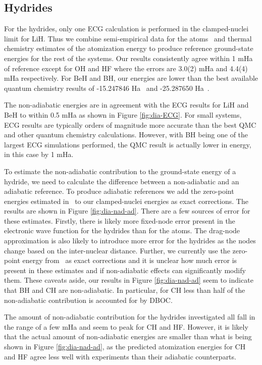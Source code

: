 \documentclass[pra,superscriptaddress,groupedaddress,twocolumn]{revtex4}
\begin{document}
\subsection{Hydrides}



For the hydrides, only one ECG calculation is performed in the clamped-nuclei limit for LiH. Thus we combine semi-empirical data for the atoms~\cite{Davidson_Atoms} and thermal chemistry estimates of the atomization energy to produce reference ground-state energies for the rest of the systems. Our results consistently agree within 1 mHa of reference except for OH and HF where the errors are 3.0(2) mHa and 4.4(4) mHa respectively. For BeH and BH, our energies are lower than the best available quantum chemistry results of -15.247846 Ha~\cite{Koput_BeH} and -25.287650 Ha~\cite{Miliordos_BH}.

The non-adiabatic energies are in agreement with the ECG results for LiH and BeH to within 0.5 mHa as shown in Figure \ref{fig:dia-ECG}. For small systems, ECG results are typically orders of magnitude more accurate than the best QMC and other quantum chemistry calculations. However, with BH being one of the largest ECG simulations performed, the QMC result is actually lower in energy, in this case by 1 mHa.

To estimate the non-adiabatic contribution to the ground-state energy of a hydride, we need to calculate the difference between a non-adiabatic and an adiabatic reference. To produce adiabatic references we add the zero-point energies estimated in~\cite{Feller_Corrections} to our clamped-nuclei energies as exact corrections. The results are shown in Figure \ref{fig:dia-nad-ad}. There are a few sources of error for these estimates. Firstly, there is likely more fixed-node error present in the electronic wave function for the hydrides than for the atoms. The drag-node approximation is also likely to introduce more error for the hydrides as the nodes change based on the inter-nuclear distance. Further, we currently use the zero-point energy from~\cite{Feller_Corrections} as exact corrections and it is unclear how much error is present in these estimates and if non-adiabatic effects can significantly modify them. These caveats aside, our results in Figure \ref{fig:dia-nad-ad} seem to indicate that BH and CH are non-adiabatic. In particular, for CH less than half of the non-adiabatic contribution is accounted for by DBOC.

The amount of non-adiabatic contribution for the hydrides investigated all fall in the range of a few mHa and seem to peak for CH and HF. However, it is likely that the actual amount of non-adiabatic energies are smaller than what is being shown in Figure \ref{fig:dia-nad-ad}, as the predicted atomization energies for CH and HF agree less well with experiments than their adiabatic counterparts. 
\end{document}

